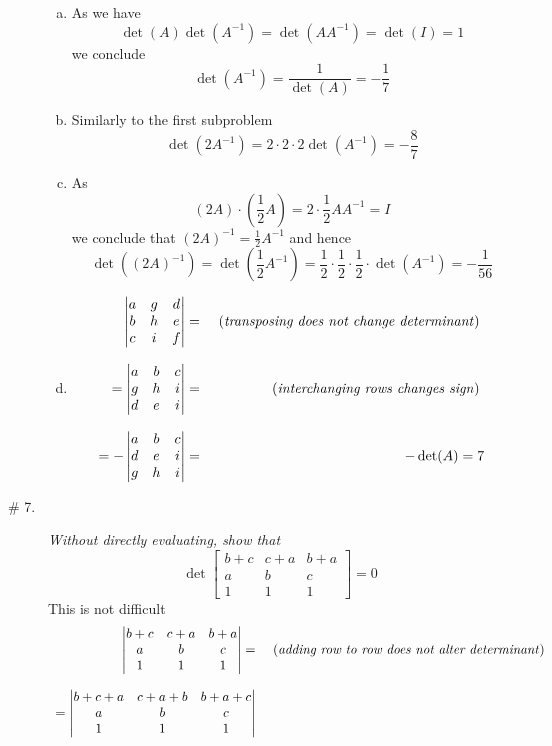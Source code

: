 \documentclass[8pt]{article} %
\begin{document}
\begin{description}
{\begin{enumerate}[(a)]
	\item As we have \[\det(A)\det(A^{-1})=\det(AA^{-1})=\det(I)=1\] we conclude \[\det(A^{-1})=\frac{1}{\det(A)}=-\frac{1}{7}\]
	\item Similarly to the first subproblem \[\det(2A^{-1})=2\cdot2\cdot2\det(A^{-1})=-\frac{8}{7}\]
	\item As \[(2A)\cdot(\frac{1}{2}A)=2\cdot\frac{1}{2}AA^{-1}=I\] we conclude that $(2A)^{-1}=\frac{1}{2}A^{-1}$ and hence
	\[\det((2A)^{-1})=\det(\frac{1}{2}A^{-1})=\frac{1}{2}\cdot\frac{1}{2}\cdot\frac{1}{2}\cdot\det(A^{-1})=-\frac{1}{56}\]
	\item 
		\[\begin{array}{rr}
		\begin{vmatrix}a&g&d\\b&h&e\\c&i&f\end{vmatrix}= &\mbox{ (\textit{transposing does not change determinant}) }\\\\
		=\begin{vmatrix}a&b&c\\g&h&i\\d&e&i\end{vmatrix}= &\mbox{ (\textit{interchanging rows changes sign}) }\\\\
			=-\begin{vmatrix}a&b&c\\d&e&i\\g&h&i\end{vmatrix}=&-\det(A)=7
		\end{array}\]
	\end{enumerate}
	}
	\item[\# 7.]{{\it Without directly evaluating, show that}
		\[\det\begin{bmatrix}b+c&c+a&b+a\\a&b&c\\1&1&1\end{bmatrix}=0\]
		This is not difficult
		\[\begin{array}{rr}
		\begin{vmatrix}b+c&c+a&b+a\\a&b&c\\1&1&1
		\end{vmatrix}= &\mbox{ (\textit{adding row to row does not alter determinant})}\\\\
		=\begin{vmatrix}b+c+a&c+a+b&b+a+c\\a&b&c\\1&1&1

\end{vmatrix}
\end{array}\]}
\end{description}
\end{document}
